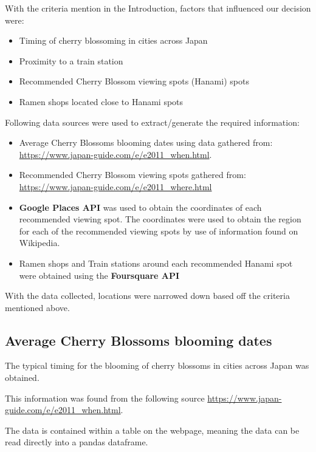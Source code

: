 \documentclass[11pt]{article}
\providecommand{\tightlist}{%
      \setlength{\itemsep}{0pt}\setlength{\parskip}{0pt}}
\begin{document}
    With the criteria mention in the Introduction, factors that influenced our decision were:
\begin{itemize}
  \tightlist
  \item Timing of cherry blossoming in cities across Japan 
  \item Proximity to a train station 
  \item Recommended Cherry Blossom viewing spots (Hanami) spots 
  \item Ramen shops located close to Hanami spots
  \end{itemize}

Following data sources were used to extract/generate the required
information: 

\begin{itemize}
  \tightlist
  \item Average Cherry Blossoms blooming dates using data gathered from: \url{https://www.japan-guide.com/e/e2011_when.html}. 
  \item Recommended Cherry Blossom viewing spots gathered from: \url{https://www.japan-guide.com/e/e2011_where.html} 
  \item \textbf{Google Places API} was used to obtain the coordinates of each recommended viewing spot. The coordinates were used 
  to obtain the region for each of the recommended viewing spots by use of information found on Wikipedia. 
  \item Ramen shops and Train stations around each recommended Hanami spot were obtained using the \textbf{Foursquare API}
\end{itemize}

With the data collected, locations  were narrowed down based off the criteria mentioned above.

    \hypertarget{average-cherry-blossoms-blooming-dates}{%
\subsection{Average Cherry Blossoms blooming
dates}\label{average-cherry-blossoms-blooming-dates}}

The typical timing for the blooming of cherry blossoms in cities across Japan was obtained.

This information was found from the following source \url{https://www.japan-guide.com/e/e2011_when.html}.

The data is contained within a table on the webpage, meaning the data can be read directly into a pandas dataframe.
\end{document}
